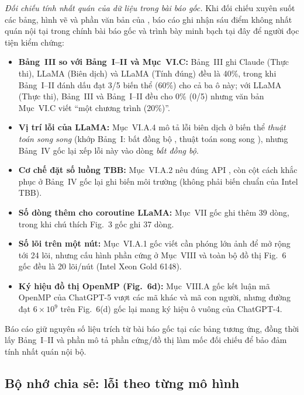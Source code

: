 \noindent\textit{Đối chiếu tính nhất quán của dữ liệu trong bài báo gốc.} Khi đối
chiếu xuyên suốt các bảng, hình vẽ và phần văn bản của \cite{diehl2026}, báo cáo
ghi nhận sáu điểm không nhất quán nội tại trong chính bài báo gốc và trình bày
minh bạch tại đây để người đọc tiện kiểm chứng:
\begin{itemize}
  \item \textbf{Bảng~III so với Bảng~I--II và Mục~VI.C:} Bảng~III ghi Claude (Thực
        thi), LLaMA (Biên dịch) và LLaMA (Tính đúng) đều là 40\%, trong khi
        Bảng~I--II đánh dấu đạt 3/5 biến thể (60\%) cho cả ba ô này; với LLaMA
        (Thực thi), Bảng~III và Bảng~I--II đều cho 0\% (0/5) nhưng văn bản
        Mục~VI.C viết “một chương trình (20\%)”.
  \item \textbf{Vị trí lỗi  của LLaMA:} Mục~VI.A.4 mô tả lỗi
        biên dịch  ở biến thể \emph{thuật toán song song}
        (khớp Bảng~I: bất đồng bộ , thuật toán song song
        ), nhưng Bảng~IV gốc lại xếp lỗi này vào dòng
        \emph{bất đồng bộ}.
  \item \textbf{Cơ chế đặt số luồng TBB:} Mục~VI.A.2 nêu đúng API
        , còn cột cách khắc phục ở Bảng~IV gốc lại ghi
        biến môi trường  (không phải biến chuẩn của Intel
        TBB).
  \item \textbf{Số dòng thêm cho coroutine LLaMA:} Mục~VII gốc ghi thêm 39 dòng,
        trong khi chú thích Fig.~3 gốc ghi 37 dòng.
  \item \textbf{Số lõi trên một nút:} Mục~VI.A.1 gốc viết cần phóng lớn ảnh để mở
        rộng tới 24 lõi, nhưng cấu hình phần cứng ở Mục~VIII và toàn bộ đồ thị
        Fig.~6 gốc đều là 20 lõi/nút (Intel Xeon Gold 6148).
  \item \textbf{Ký hiệu đồ thị OpenMP (Fig.~6d):} Mục~VIII.A gốc kết luận mã
        OpenMP của ChatGPT-5 vượt các mã khác và mã con người, nhưng đường đạt
        $6\times 10^9$ trên Fig.~6(d) gốc lại mang ký hiệu ô vuông của ChatGPT-4.
\end{itemize}
Báo cáo giữ nguyên số liệu trích từ bài báo gốc tại các bảng tương ứng, đồng thời
lấy Bảng~I--II và phần mô tả phần cứng/đồ thị làm mốc đối chiếu để bảo đảm tính
nhất quán nội bộ.

\subsection{Bộ nhớ chia sẻ: lỗi theo từng mô hình}

